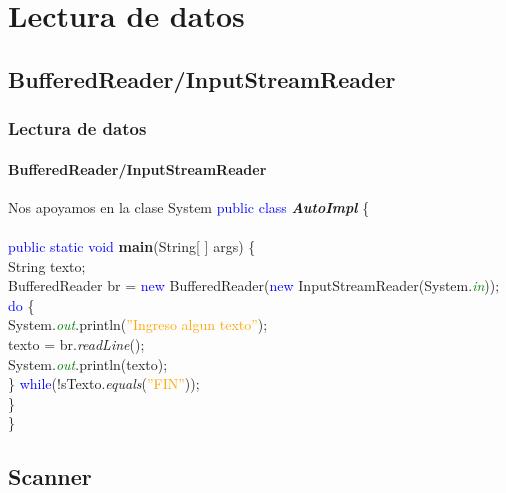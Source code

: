 \documentclass{beamer}
\begin{document}
    \section{Lectura de datos}
    
		\subsection{BufferedReader/InputStreamReader}
		
		\begin{frame}
			\frametitle{Lectura de datos}
			\framesubtitle{BufferedReader/InputStreamReader}

            \begin{block}{Nos apoyamos en la clase System}
				{\scriptsize
				\textcolor{blue}{public class} \textbf{\emph{AutoImpl}} \{ \\
				\hspace{1cm} \\
				\hspace{1cm} \textcolor{blue}{public static void} \textbf{main}(String[ ] args) \{ \\
				\hspace{2cm} String texto; \\
				\hspace{2cm} BufferedReader br = \textcolor{blue}{new} BufferedReader(\textcolor{blue}{new} InputStreamReader(System.\textcolor{green}{\emph{in}})); \\
				\hspace{2cm} \textcolor{blue}{do} \{ \\
				\hspace{3cm} System.\emph{\textcolor{green}{out}}.println(\textcolor{orange}{''Ingreso algun texto''});\\
				\hspace{3cm} texto = br.\emph{readLine}();\\
				\hspace{3cm} System.\emph{\textcolor{green}{out}}.println(texto);\\
				\hspace{2cm} \} \textcolor{blue}{while}(!sTexto.\emph{equals}(\textcolor{orange}{''FIN''})); \\
				\hspace{1cm} \} \\
				\}}
			\end{block}
		\end{frame}		
		
		\subsection{Scanner}
\end{document}
